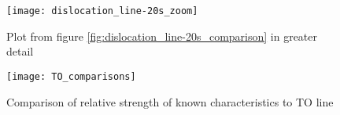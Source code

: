 \begin{figure}[H]
\centering
\texttt{[image: dislocation\_line-20s\_zoom]}
\caption[Comparisons in a dislocation line]{Plot from figure \ref{fig:dislocation_line-20s_comparison} in greater detail}
\label{fig:dislocation_line-20s_zoom_comparison}%
\end{figure}

\begin{figure}[H]
\centering
\texttt{[image: TO\_comparisons]}
\caption[Comparison or relative strength]{Comparison of relative strength of known characteristics to TO line}
\label{fig:TO_comparisons}%
\end{figure}